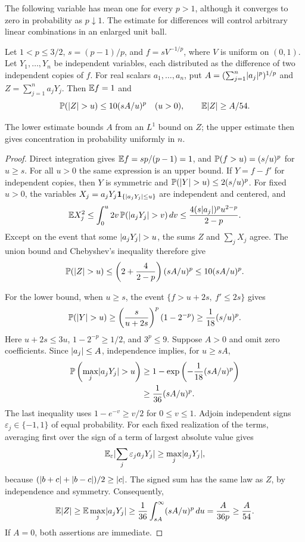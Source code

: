 The following variable has mean one for every $p>1$, although it converges
to zero in probability as $p\downarrow1$.  The estimate for differences
will control arbitrary linear combinations in an enlarged unit ball.

\begin{lemma}\label{kw:heavy-tail}
Let $1<p\le3/2$, $s=(p-1)/p$, and $f=sV^{-1/p}$, where $V$ is uniform
on $(0,1)$.  Let $Y_1,\dots,Y_n$ be independent variables, each distributed
as the difference of two independent copies of $f$.  For real scalars
$a_1,\dots,a_n$, put
$A=(\sum_{j=1}^n\lvert a_j\rvert^{p})^{1/p}$ and $Z=\sum_{j=1}^n a_jY_j$.
Then $\mathbb E f=1$ and
\begin{equation}\label{kw:heavy-bounds}
 \mathbb P(\lvert Z\rvert>u)\le10(sA/u)^p\quad(u>0),
 \qquad \mathbb E\lvert Z\rvert\ge A/54.
\end{equation}
\end{lemma}

The lower estimate bounds $A$ from an $L^1$ bound on $Z$;
the upper estimate then gives concentration in probability uniformly in $n$.

\begin{proof}
Direct integration gives $\mathbb E f=sp/(p-1)=1$, and
$\mathbb P(f>u)=(s/u)^p$ for $u\ge s$.  For all $u>0$ the same expression
is an upper bound.  If $Y=f-f'$ for independent copies, then $Y$ is
symmetric and $\mathbb P(\lvert Y\rvert>u)\le2(s/u)^p$.
For fixed $u>0$, the variables
$X_j=a_jY_j\mathbf1_{\{\lvert a_jY_j\rvert\le u\}}$ are independent and
centered, and
\[
 \mathbb E X_j^2
 \le\int_0^u 2v\,\mathbb P(\lvert a_jY_j\rvert>v)\,dv
 \le\frac{4(s\lvert a_j\rvert)^p u^{2-p}}{2-p}.
\]
Except on the event that some $\lvert a_jY_j\rvert>u$, the sums $Z$ and
$\sum_jX_j$ agree.  The union bound and Chebyshev's inequality therefore
give
\[
 \mathbb P(\lvert Z\rvert>u)
 \le\left(2+\frac4{2-p}\right)(sA/u)^p
 \le10(sA/u)^p.
\]

For the lower bound, when $u\ge s$, the event
$\{f>u+2s,\ f'\le2s\}$ gives
\[
 \mathbb P(\lvert Y\rvert>u)
 \ge\left(\frac{s}{u+2s}\right)^p(1-2^{-p})
 \ge\frac1{18}(s/u)^p.
\]
Here $u+2s\le3u$, $1-2^{-p}\ge1/2$, and $3^p\le9$.
Suppose $A>0$ and omit zero coefficients.  Since $\lvert a_j\rvert\le A$,
independence implies, for $u\ge sA$,
\begin{align*}
 \mathbb P\left(\max_j\lvert a_jY_j\rvert>u\right)
 &\ge1-\exp\left(-\frac1{18}(sA/u)^p\right)\\
 &\ge\frac1{36}(sA/u)^p.
\end{align*}
The last inequality uses $1-e^{-v}\ge v/2$ for $0\le v\le1$.
Adjoin independent signs $\varepsilon_j\in\{-1,1\}$ of equal probability.
For each fixed realization of the terms, averaging first over the sign
of a term of largest absolute value gives
\[
 \mathbb E_{\varepsilon}\lvert\sum_j\varepsilon_j a_jY_j\rvert
 \ge\max_j\lvert a_jY_j\rvert,
\]
because $(\lvert b+c\rvert+\lvert b-c\rvert)/2\ge\lvert c\rvert$.
The signed sum has the same law as $Z$, by independence and symmetry.
Consequently,
\[
 \mathbb E\lvert Z\rvert\ge\mathbb E\max_j\lvert a_jY_j\rvert
 \ge\frac1{36}\int_{sA}^\infty(sA/u)^p\,du
 =\frac{A}{36p}\ge\frac A{54}.
\]
If $A=0$, both assertions are immediate.
\end{proof}

